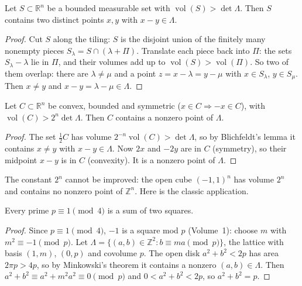 \begin{lemma}[Blichfeldt]\label{geometry:lem:blichfeldt}
Let $S\subset\mathbb R^n$ be a bounded measurable set with $\operatorname{vol}(S)>\det\Lambda$. Then $S$ contains two distinct points $x,y$ with $x-y\in\Lambda$.
\end{lemma}

\begin{proof}
Cut $S$ along the tiling: $S$ is the disjoint union of the finitely many nonempty pieces $S_\lambda=S\cap(\lambda+\Pi)$. Translate each piece back into $\Pi$:
the sets $S_\lambda-\lambda$ lie in $\Pi$, and their volumes add up to $\operatorname{vol}(S)>\operatorname{vol}(\Pi)$. So two of them overlap: there are
$\lambda\ne\mu$ and a point $z=x-\lambda=y-\mu$ with $x\in S_\lambda$, $y\in S_\mu$. Then $x\ne y$ and $x-y=\lambda-\mu\in\Lambda$.
\end{proof}

\begin{theorem}[Minkowski]\label{geometry:thm:minkowski}
Let $C\subset\mathbb R^n$ be convex, bounded and symmetric ($x\in C\Rightarrow-x\in C$), with $\operatorname{vol}(C)>2^n\det\Lambda$. Then $C$ contains a nonzero
point of $\Lambda$.
\end{theorem}

\begin{proof}
The set $\frac12C$ has volume $2^{-n}\operatorname{vol}(C)>\det\Lambda$, so by Blichfeldt's lemma it contains $x\ne y$ with $x-y\in\Lambda$. Now $2x$ and $-2y$ are in
$C$ (symmetry), so their midpoint $x-y$ is in $C$ (convexity). It is a nonzero point of $\Lambda$.
\end{proof}

The constant $2^n$ cannot be improved: the open cube $(-1,1)^n$ has volume $2^n$ and contains no nonzero point of $\mathbb Z^n$. Here is the classic application.

\begin{theorem}[Fermat]\label{geometry:thm:twosquares}
Every prime $p\equiv1\pmod4$ is a sum of two squares.
\end{theorem}

\begin{proof}
Since $p\equiv1\pmod4$, $-1$ is a square mod $p$ (Volume~1): choose $m$ with $m^2\equiv-1\pmod p$. Let $\Lambda=\{(a,b)\in\mathbb Z^2:b\equiv ma\pmod p\}$, the
lattice with basis $(1,m)$, $(0,p)$ and covolume $p$. The open disk $a^2+b^2<2p$ has area $2\pi p>4p$, so by Minkowski's theorem it contains a nonzero
$(a,b)\in\Lambda$. Then $a^2+b^2\equiv a^2+m^2a^2\equiv0\pmod p$ and $0<a^2+b^2<2p$, so $a^2+b^2=p$.
\end{proof}

